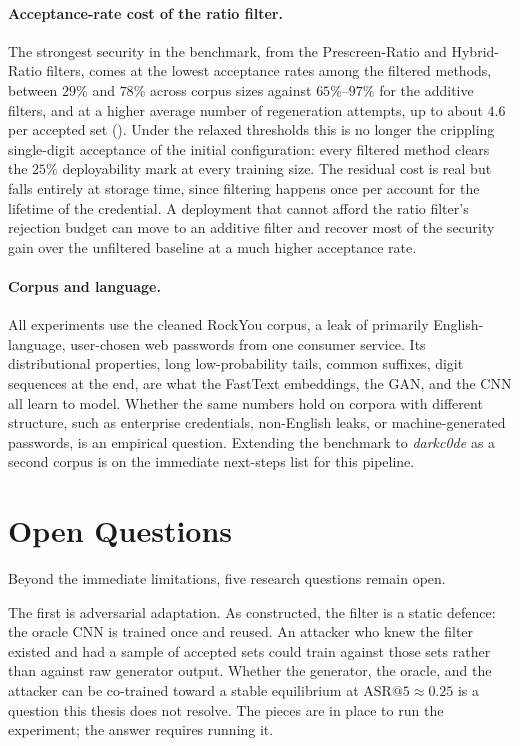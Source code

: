 \paragraph{Acceptance-rate cost of the ratio filter.}
The strongest security in the benchmark, from the Prescreen-Ratio and
Hybrid-Ratio filters, comes at the lowest acceptance rates among the
filtered methods, between $29\%$ and $78\%$ across corpus sizes against
$65\%$--$97\%$ for the additive filters, and at a higher average number
of regeneration attempts, up to about $4.6$ per accepted set
(). Under the relaxed thresholds this is no longer the
crippling single-digit acceptance of the initial configuration: every
filtered method clears the $25\%$ deployability mark at every training
size. The residual cost is real but falls entirely at storage time,
since filtering happens once per account for the lifetime of the
credential. A deployment that cannot afford the ratio filter's rejection
budget can move to an additive filter and recover most of the security
gain over the unfiltered baseline at a much higher acceptance rate.

\paragraph{Corpus and language.}
All experiments use the cleaned RockYou corpus, a leak of primarily
English-language, user-chosen web passwords from one consumer service.
Its distributional properties, long low-probability tails, common
suffixes, digit sequences at the end, are what the FastText embeddings,
the GAN, and the CNN all learn to model. Whether the same numbers hold
on corpora with different structure, such as enterprise credentials,
non-English leaks, or machine-generated passwords, is an empirical
question. Extending the benchmark to \emph{darkc0de} as a second corpus
is on the immediate next-steps list for this pipeline.

\section{Open Questions}

Beyond the immediate limitations, five research questions remain open.

The first is adversarial adaptation. As constructed, the filter is a
static defence: the oracle CNN is trained once and reused. An attacker
who knew the filter existed and had a sample of accepted sets could
train against those sets rather than against raw generator output.
Whether the generator, the oracle, and the attacker can be co-trained
toward a stable equilibrium at $\mathrm{ASR}@5 \approx 0.25$ is a
question this thesis does not resolve. The pieces are in place to run
the experiment; the answer requires running it.

